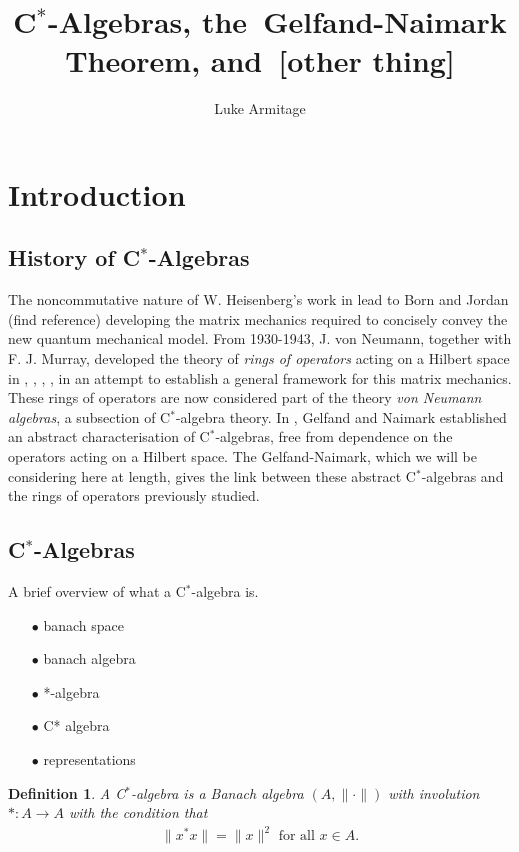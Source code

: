 \documentclass[12pt,a4paper]{amsart}
\author{Luke Armitage}
\title{C$^\ast$-Algebras, the~Gelfand-Naimark Theorem, and~[other thing]}
\theoremstyle{plain}
\theoremstyle{defn}
\newtheorem{defn}{Definition}
\begin{document}
\maketitle
\section{Introduction}
\subsection{History of C$^\ast$-Algebras}
	The noncommutative nature of W. Heisenberg's work in \cite{heisenberg25} lead to Born and Jordan (find reference) developing the matrix mechanics required to concisely convey the new quantum mechanical model.
	From 1930-1943, J. von Neumann, together with F. J. Murray, developed the theory of \emph{rings of operators} acting on a Hilbert space in \cite{vonneumann35}, \cite{vonneumann37}, \cite{vonneumann40}, \cite{vonneumann43}, in an attempt to establish a general framework for this matrix mechanics.
	These rings of operators are now considered part of the theory \emph{von Neumann algebras}, a subsection of C$^\ast$-algebra theory.
	In \cite{gelfand43}, Gelfand and Naimark established an abstract characterisation of C$^\ast$-algebras, free from dependence on the operators acting on a Hilbert space.
	The Gelfand-Naimark, which we will be considering here at length, gives the link between these abstract C$^\ast$-algebras and the rings of operators previously studied.
	
	
\subsection{C$^\ast$-Algebras}
	A brief overview of what a C$^\ast$-algebra is.
\begin{enumerate}
	\item[$\bullet$] banach space
	\item[$\bullet$] banach algebra
	\item[$\bullet$] *-algebra
	\item[$\bullet$] C* algebra
	\item[$\bullet$] representations
\end{enumerate}
\begin{defn}
A \emph{C$^\ast$-algebra} is a Banach algebra $(A, \| \cdot \|)$ with involution $\ast : A \to A$ with the condition that
\begin{align*}
	\|x ^\ast x\| = \|x\|^2 \mbox{ for all } x \in A.
\end{align*}
\end{defn}
 
\end{document}
